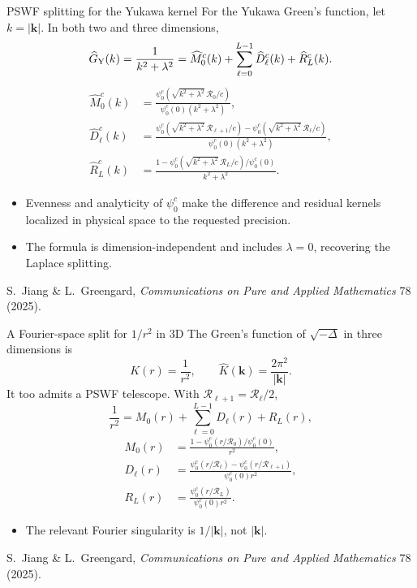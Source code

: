 \documentclass[aspectratio=169,11pt]{beamer}
\newcommand{\cR}{\mathcal{R}}
\newcommand{\kk}{\bm{k}}
\newcommand{\gray}[1]{{\color{mygray}#1}}
\begin{document}
\begin{frame}{PSWF splitting for the Yukawa kernel}
\footnotesize
For the Yukawa Green's function, let \(k=|\kk|\).  In both two and three
dimensions,
\[
  \widehat G_{\rm Y}(k)=\frac{1}{k^2+\lambda^2}
  =\widehat M_0^c(k)+\sum_{\ell=0}^{L-1}\widehat D_\ell^c(k)+\widehat R_L^c(k).
\]
\[
\begin{aligned}
\widehat M_0^c(k)
  &=\frac{\psi_0^c\!\left(\sqrt{k^2+\lambda^2}\,\cR_0/c\right)}
          {\psi_0^c(0)(k^2+\lambda^2)},\\
\widehat D_\ell^c(k)
  &=\frac{\psi_0^c\!\left(\sqrt{k^2+\lambda^2}\,\cR_{\ell+1}/c\right)
          -\psi_0^c\!\left(\sqrt{k^2+\lambda^2}\,\cR_\ell/c\right)}
          {\psi_0^c(0)(k^2+\lambda^2)},\\
\widehat R_L^c(k)
  &=\frac{1-\psi_0^c\!\left(\sqrt{k^2+\lambda^2}\,\cR_L/c\right)/\psi_0^c(0)}
          {k^2+\lambda^2}.
\end{aligned}
\]
\begin{itemize}\itemsep1pt
  \item Evenness and analyticity of \(\psi_0^c\) make the difference and residual kernels localized in physical space to the requested precision.
  \item The formula is dimension-independent and includes \(\lambda=0\), recovering the Laplace splitting.
\end{itemize}
{\scriptsize\gray{S.\ Jiang \& L.\ Greengard, \emph{Communications on Pure and Applied Mathematics} 78 (2025).}}
\end{frame}

\begin{frame}{A Fourier-space split for \(1/r^2\) in 3D}
\small
\setlength{\abovedisplayskip}{3pt}
\setlength{\belowdisplayskip}{3pt}
The Green's function of \(\sqrt{-\Delta}\) in three dimensions is
\[
  K(r)=\frac{1}{r^2},\qquad \widehat K(\kk)=\frac{2\pi^2}{|\kk|}.
\]
It too admits a PSWF telescope.  With \(\cR_{\ell+1}=\cR_\ell/2\),
\[
  \frac{1}{r^2}=M_0(r)+\sum_{\ell=0}^{L-1}D_\ell(r)+R_L(r),
\]
\[
\begin{aligned}
 M_0(r)&=\frac{1-\psi_0^c(r/\cR_0)/\psi_0^c(0)}{r^2},\\
 D_\ell(r)&=\frac{\psi_0^c(r/\cR_\ell)-\psi_0^c(r/\cR_{\ell+1})}{\psi_0^c(0)r^2},\\
 R_L(r)&=\frac{\psi_0^c(r/\cR_L)}{\psi_0^c(0)r^2}.
\end{aligned}
\]
\begin{itemize}
  \item The relevant Fourier singularity is \(1/|\kk|\), not \(|\kk|\).
\end{itemize}
{\scriptsize\gray{S.\ Jiang \& L.\ Greengard, \emph{Communications on Pure and Applied Mathematics} 78 (2025).}}
\end{frame}
\end{document}
